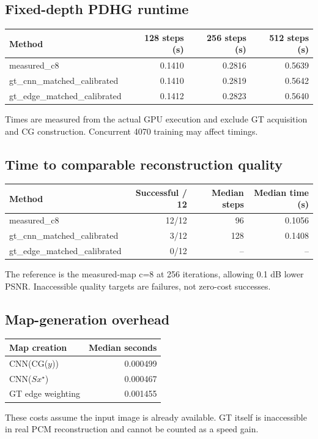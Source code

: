 \documentclass[11pt,a4paper]{article}
\begin{document}
\subsection{Fixed-depth PDHG runtime}
\begin{center}\small\begin{tabular}{lrrr}\toprule Method & 128 steps (s) & 256 steps (s) & 512 steps (s) \\ \midrule
measured\_c8 & 0.1410 & 0.2816 & 0.5639 \\
gt\_cnn\_matched\_calibrated & 0.1410 & 0.2819 & 0.5642 \\
gt\_edge\_matched\_calibrated & 0.1412 & 0.2823 & 0.5640 \\
\bottomrule\end{tabular}\end{center}
Times are measured from the actual GPU execution and exclude GT acquisition and CG construction. Concurrent 4070 training may affect timings.
\subsection{Time to comparable reconstruction quality}
\begin{center}\small\begin{tabular}{lrrr}\toprule Method & Successful / 12 & Median steps & Median time (s) \\ \midrule
measured\_c8 & 12/12 & 96 & 0.1056 \\
gt\_cnn\_matched\_calibrated & 3/12 & 128 & 0.1408 \\
gt\_edge\_matched\_calibrated & 0/12 & -- & -- \\
\bottomrule\end{tabular}\end{center}
The reference is the measured-map c=8 at 256 iterations, allowing 0.1 dB lower PSNR. Inaccessible quality targets are failures, not zero-cost successes.
\subsection{Map-generation overhead}
\begin{center}\begin{tabular}{lr}\toprule Map creation & Median seconds \\ \midrule
CNN(CG($y$)) & 0.000499 \\
CNN($Sx^\star$) & 0.000467 \\
GT edge weighting & 0.001455 \\
\bottomrule\end{tabular}\end{center}
These costs assume the input image is already available. GT itself is inaccessible in real PCM reconstruction and cannot be counted as a speed gain.
\end{document}
